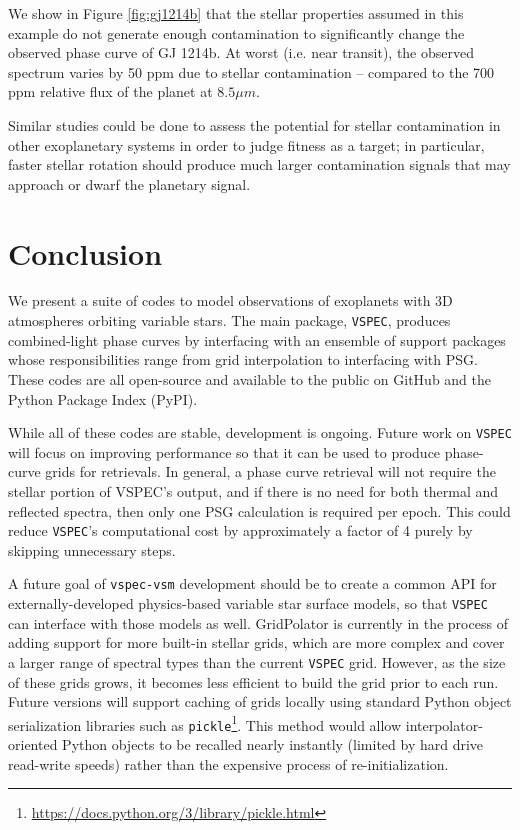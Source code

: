 \documentclass[linenumbers,5p,twocolumn,authoryear]{elsarticle}
\newcommand{\vspec}[1]{\texttt{VSPEC}#1}
\begin{document}
We show in Figure \ref{fig:gj1214b} that the stellar properties assumed in this example do not generate enough contamination to
significantly change the observed phase curve of GJ 1214b. At worst (i.e. near transit), the observed spectrum varies by 50 ppm due to stellar
contamination -- compared to the 700 ppm relative flux of the planet at $8.5 {\mu m}$. 

Similar studies could be done to assess the potential for
stellar contamination in other exoplanetary systems in order to judge fitness as a target; in particular, faster stellar rotation should produce much larger contamination signals that may approach or dwarf the planetary signal.

\section{Conclusion}
\label{sec:conclusion}
We present a suite of codes to model observations of exoplanets with 3D atmospheres orbiting variable stars. The main package, \vspec{}, produces combined-light phase curves by interfacing with an ensemble of support packages whose responsibilities range from grid interpolation to interfacing with PSG. These codes are all open-source and available to the public on GitHub and the Python Package Index (PyPI).

While all of these codes are stable, development is ongoing. Future work on \vspec{} will focus on improving performance so that it can be used to produce phase-curve grids for retrievals. In general, a phase curve retrieval will not require the stellar portion of VSPEC's output, and if there is no need for both thermal and reflected spectra, then only one PSG calculation is required per epoch. This could reduce \vspec{}'s computational cost by approximately a factor of 4 purely by skipping unnecessary steps.

A future goal of \texttt{vspec-vsm} development should be to create a common API for externally-developed physics-based variable star surface models, so that \vspec{} can interface with those models as well. GridPolator is currently in the process of adding support for more built-in stellar grids, which are more complex and cover a larger range of spectral types than the current \vspec{} grid. However, as the size of these grids grows, it becomes less efficient to build the grid prior to each run. Future versions will support caching of grids locally using standard Python object serialization libraries such as \texttt{pickle}\footnote{\url{https://docs.python.org/3/library/pickle.html}}. This method would allow interpolator-oriented Python objects to be recalled nearly instantly (limited by hard drive read-write speeds) rather than the expensive process of re-initialization.
\end{document}
